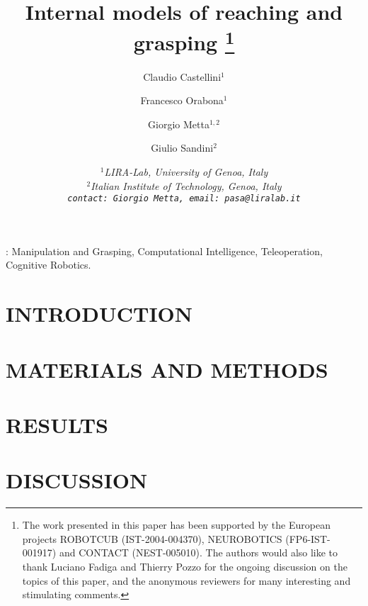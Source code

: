 \documentclass[a4paper]{arsubmit}
\title{Internal models of reaching and grasping
\footnote{The work presented in this paper has been supported by the
European projects ROBOTCUB (IST-2004-004370), NEUROBOTICS
(FP6-IST-001917) and CONTACT (NEST-005010). The authors would also
like to thank Luciano Fadiga and Thierry Pozzo for the ongoing
discussion on the topics of this paper, and the anonymous reviewers for
many interesting and stimulating comments.}
}
\author{Claudio Castellini$^1$ \and Francesco Orabona$^1$ \and Giorgio
Metta$^{1,2}$ \and Giulio Sandini$^2$}
\date{\small \it{
$^1$LIRA-Lab, University of Genoa, Italy\\
$^2$Italian Institute of Technology, Genoa, Italy\\
{\tt contact: Giorgio Metta, email: pasa@liralab.it}
}}
\begin{document}
\maketitle

\begin{abstract}

\end{abstract}

\vspace{1cm}
:
Manipulation and Grasping,
Computational Intelligence,
Teleoperation,
Cognitive Robotics.

\section{INTRODUCTION}
\label{sec:introduction}


\section{MATERIALS AND METHODS}
\label{sec:exp_desc}


\section{RESULTS}
\label{sec:exp_res}


\section{DISCUSSION}
\label{sec:Conclusions}


{\small


}
\end{document}
